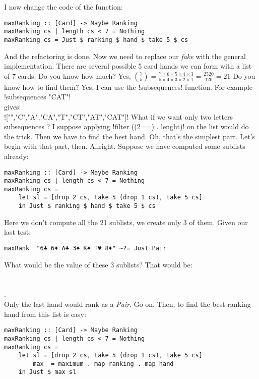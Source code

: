 \lhA \error I now change the code of the function:
\begin{lstlisting}[frame=single]
maxRanking :: [Card] -> Maybe Ranking
maxRanking cs | length cs < 7 = Nothing
maxRanking cs = Just $ ranking $ hand $ take 5 $ cs
\end{lstlisting}
\success And the refactoring is done. Now we need to replace our \emph{fake} with the general implementation.
\lhN There are several possible 5 card hands we can form with a list of 7 cards. Do you know how much?
\lhA Yes, ${{7}\choose{5}} = \frac{7\times6 \times 5 \times 4 \times 3}{5 \times 4 \times 3 \times 2 \times 1} = \frac{2520}{120} = 21$
\lhN Do you know how to find them?
\lhA Yes. I can use the \il!subsequences! function. For example\\ 
\il!subsequences "CAT"! \\
gives: \\
\il!["","C","A","CA","T","CT","AT","CAT"]!
\lhN What if we want only two letters subsequences ?
\lhA I suppose applying \il!filter ((2==) . lenght)! on the list would do the trick.
\lhN Then we have to find the best hand.
\lhA Oh, that's the simplest part.
\lhN Let's begin with that part, then.
\lhA Allright. Suppose we have computed some sublists already:
\begin{lstlisting}[frame=single]
maxRanking :: [Card] -> Maybe Ranking
maxRanking cs | length cs < 7 = Nothing
maxRanking cs = 
    let sl = [drop 2 cs, take 5 (drop 1 cs), take 5 cs]
    in Just $ ranking $ hand $ take 5 $ cs
\end{lstlisting}
\success Here we don't compute all the 21 sublists, we create only 3 of them. 
\lhN Given our last test:
\begin{lstlisting}[frame=single]
maxRank  "6♣ 6♦ A♣ 3♠ K♠ T♥ 8♦" ~?= Just Pair
\end{lstlisting}
What would be the value of these 3 sublists?
\lhA That would be:\\
     \\ 
      \\
    . \\
Only the last hand would rank as a \emph{Pair}.
\lhN Go on.
\lhA Then, to find the best ranking hand from this list is easy:
\begin{lstlisting}[frame=single]
maxRanking :: [Card] -> Maybe Ranking
maxRanking cs | length cs < 7 = Nothing
maxRanking cs = 
    let sl = [drop 2 cs, take 5 (drop 1 cs), take 5 cs]
        max  = maximum . map ranking . map hand
    in Just $ max sl
\end{lstlisting} %
